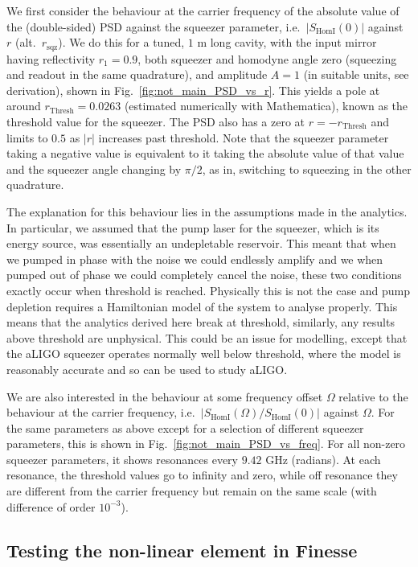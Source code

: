 \documentclass[aps,pra,superscriptaddress,reprint,nofootinbib]{revtex4-1}
\newcommand{\abs}[1]{\left\lvert #1 \right\rvert}
\begin{document}
We first consider the behaviour at the carrier frequency of the absolute value of the (double-sided) PSD against the squeezer parameter, i.e.\ $\abs{S_{\mathrm{HomI}}(0)}$ against $r$ (alt.\ $r_\mathrm{sqz}$). We do this for a tuned, $1$ m long cavity, with the input mirror having reflectivity $r_1 = 0.9$, both squeezer and homodyne angle zero (squeezing and readout in the same quadrature), and amplitude $A = 1$ (in suitable units, see derivation), shown in Fig.~\ref{fig:not_main_PSD_vs_r}. This yields a pole at around $r_\mathrm{Thresh} = 0.0263$ (estimated numerically with Mathematica), known as the threshold value for the squeezer. The PSD also has a zero at $r = -r_\mathrm{Thresh}$ and limits to $0.5$ as $\abs{r}$ increases past threshold. Note that the squeezer parameter taking a negative value is equivalent to it taking the absolute value of that value and the squeezer angle changing by $\pi/2$, as in, switching to squeezing in the other quadrature.


The explanation for this behaviour lies in the assumptions made in the analytics. In particular, we assumed that the pump laser for the squeezer, which is its energy source, was essentially an undepletable reservoir. This meant that when we pumped in phase with the noise we could endlessly amplify and we when pumped out of phase we could completely cancel the noise, these two conditions exactly occur when threshold is reached. Physically this is not the case and pump depletion requires a Hamiltonian model of the system to analyse properly. This means that the analytics derived here break at threshold, similarly, any results above threshold are unphysical.
This could be an issue for modelling, except that the aLIGO squeezer operates normally well below threshold, where the model is reasonably accurate and so can be used to study aLIGO.


We are also interested in the behaviour at some frequency offset $\Omega$ relative to the behaviour at the carrier frequency, i.e.\ $\abs{S_{\mathrm{HomI}}(\Omega)/S_{\mathrm{HomI}}(0)}$ against $\Omega$. For the same parameters as above except for a selection of different squeezer parameters, this is shown in Fig.~\ref{fig:not_main_PSD_vs_freq}. For all non-zero squeezer parameters, it shows resonances every $9.42$ GHz (radians). At each resonance, the threshold values go to infinity and zero, while off resonance they are different from the carrier frequency but remain on the same scale (with difference of order $10^{-3}$).


\subsection{Testing the non-linear element in Finesse}
\end{document}
